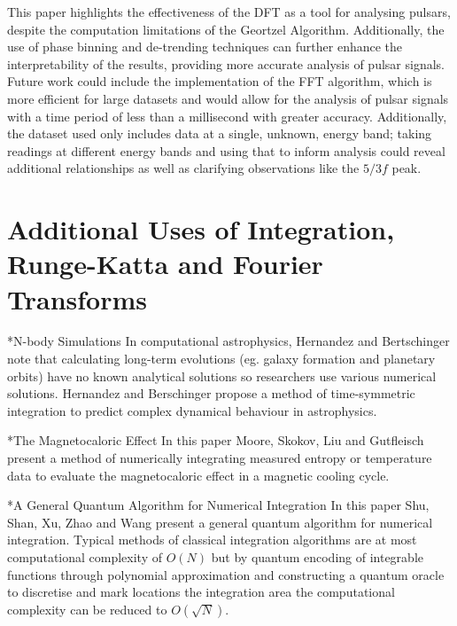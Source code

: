\documentclass[reqno]{amsart}
\makeatletter
\newcommand{\nocontentsline}[3]{}
\newcommand\stoptoc{\let\addcontentsline\nocontentsline}
\renewcommand\subsection{\@startsection{subsection}{2}%
  \z@{.5\linespacing\@plus.7\linespacing}{-.5em}%
  {\normalfont\scshape\justify}}
\numberwithin{equation}{section}
\numberwithin{figure}{section}
\makeatother
\begin{document}
This paper highlights the effectiveness of the DFT as a tool for analysing pulsars, despite the computation limitations of the Geortzel Algorithm. Additionally, the use of phase binning and de-trending techniques can further enhance the interpretability of the results, providing more accurate analysis of pulsar signals. \\

Future work could include the implementation of the FFT algorithm, which is more efficient for large datasets and would allow for the analysis of pulsar signals with a time period of less than a millisecond with greater accuracy. Additionally, the dataset used only includes data at a single, unknown, energy band; taking readings at different energy bands and using that to inform analysis could reveal additional relationships as well as clarifying observations like the $5/3f$ peak.

\appendix
\stoptoc
\section{Additional Uses of Integration, Runge-Katta and Fourier Transforms}

\subsection*{N-body Simulations}
In computational astrophysics, Hernandez and Bertschinger \cite{Hernandez2018} note that calculating long-term evolutions (eg. galaxy formation and planetary orbits) have no known analytical solutions so researchers use various numerical solutions. Hernandez and Berschinger propose a method of time-symmetric integration to predict complex dynamical behaviour in astrophysics.

\subsection*{The Magnetocaloric Effect}
In this paper Moore, Skokov, Liu and Gutfleisch \cite{Moore2012} present a method of numerically integrating measured entropy or temperature data to evaluate the magnetocaloric effect in a magnetic cooling cycle.

\subsection*{A General Quantum Algorithm for Numerical Integration}
In this paper Shu, Shan, Xu, Zhao and Wang \cite{Shu2024} present a general quantum algorithm for numerical integration. Typical methods of classical integration algorithms are at most computational complexity of $O(N)$ but by quantum encoding of integrable functions through polynomial approximation and constructing a quantum oracle to discretise and mark locations the integration area the computational complexity can be reduced to $O(\sqrt{N})$.
\end{document}
